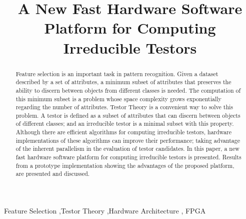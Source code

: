 \documentclass[authoryear,preprint,review,12pt]{elsarticle}
\begin{document}
\begin{frontmatter}



\title{A New Fast Hardware Software Platform for Computing Irreducible Testors}



\address{Computer Science Department}
\address{National Institute for Astrophysics, Optics and Electronics}
\address{Sta. Ma. Tonanzintla, Puebla, 72840, Mexico}

\begin{abstract}
Feature selection is an important task in pattern recognition. Given a dataset described by a set of attributes, a minimum subset of attributes that preserves the ability to discern between objects from different classes is needed. The computation of this minimum subset is a problem whose space complexity grows
exponentially regarding the number of attributes. Testor Theory is a convenient way to solve this problem. A testor is defined as a subset of attributes that can discern between objects of different classes; and an irreducible testor is a minimal subset with this property. Although there are efficient algorithms for computing irreducible testors, hardware implementations of these algorithms can improve their performance; taking advantage of the inherent parallelism in the evaluation of testor candidates. In this paper, a new fast hardware software platform for computing irreducible testors is presented. Results from a prototype implementation showing the advantages of the proposed platform, are presented and discussed.

\end{abstract}

\begin{keyword}
Feature Selection \sep Testor Theory \sep Hardware Architecture \sep
FPGA

\end{keyword}

\end{frontmatter}
\end{document}
